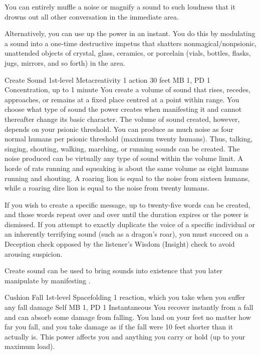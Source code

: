   You can entirely muffle a noise or magnify a sound to such loudness
  that it drowns out all other conversation in the immediate area.
  
  Alternatively, you can use up the power in an instant.
  You do this by modulating a sound into a one-time destructive impetus
  that shatters nonmagical/nonpsionic,
  unattended objects of crystal, glass, ceramics, or porcelain
  (vials, bottles, flasks, jugs, mirrors, and so forth) in the area.

\DndPowerHeader%
  {Create Sound}
  {1st-level Metacreativity}
  {1 action}
  {30 feet}
  {MB 1, PD 1}
  {Concentration, up to 1 minute}
  You create a volume of sound that rises, recedes, approaches,
  or remains at a fixed place centred at a point within range.
  You choose what type of sound the power creates when manifesting it
  and cannot thereafter change its basic character.
  The volume of sound created, however, depends on your psionic threshold.
  You can produce as much noise as four normal humans per psionic threshold
  (maximum twenty humans).
  Thus, talking, singing, shouting, walking,
  marching, or running sounds can be created.
  The noise produced can be virtually any type of sound within the volume limit.
  A horde of rats running and squeaking is about the same volume as eight humans
  running and shouting.
  A roaring lion is equal to the noise from sixteen humans,
  while a roaring dire lion is equal to the noise from twenty humans.

  If you wish to create a specific message,
  up to twenty-five words can be created,
  and those words repeat over and over until the duration expires
  or the power is dismissed.
  If you attempt to exactly duplicate the voice of a specific individual
  or an inherently terrifying sound
  (such as a dragon's roar),
  you must succeed on a Deception check opposed
  by the listener's Wisdom (Insight) check to avoid arousing suspicion.
  
  Create sound can be used to bring sounds into existence that you later
  manipulate by manifesting .

\DndPowerHeader%
  {Cushion Fall}
  {1st-level Spacefolding}
  {1 reaction, which you take when you suffer any fall damage}
  {Self}
  {MB 1, PD 1}
  {Instantaneous}
  You recover instantly from a fall
  and can absorb some damage from falling.
  You land on your feet no matter how far you fall,
  and you take damage as if the fall were
  10 feet shorter than it actually is.
  This power affects you and anything you carry or hold
  (up to your maximum load).

